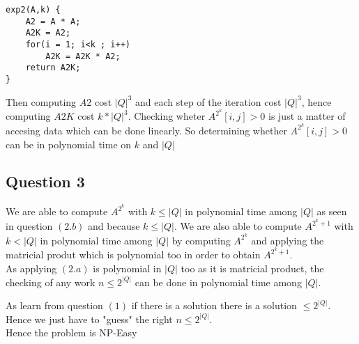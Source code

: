 \begin{lstlisting}
exp2(A,k) {
	A2 = A * A;
	A2K = A2;
	for(i = 1; i<k ; i++)
		A2K = A2K * A2;
	return A2K;
}
\end{lstlisting}
Then computing $A2$ cost $|Q|^3$ and each step of the iteration cost $|Q|^3$, hence computing $A2K$ cost $k*|Q|^3$. Checking wheter 
$A^{2^k}[i,j] > 0$ is just a matter of accesing data which can be done linearly.
So determining whether $A^{2^k}[i,j] > 0$ can be in polynomial time on $k$ and $|Q|$
 
\subsection{Question 3}
 
We are able to compute $A^{2^k}$ with $k\le|Q|$ in polynomial time among $|Q|$ as seen in question $(2.b)$ and because $k\le|Q|$.
We are also able to compute $A^{2^{k}+1}$ with $k < |Q|$ in polynomial time among $|Q|$  by computing $A^{2^k}$ and applying the matricial produt which is polynomial too in order to obtain $A^{2^{k}+1}$.
\\As applying $(2.a)$ is polynomial in $|Q|$ too as it is matricial product,
the checking of any work $n \le 2^{|Q|}$ can be done in polynomial time among $|Q|$.

As learn from question $(1)$ if there is a solution there is a solution $\le 2^{|Q|}$.
\\Hence we just have to "guess" the right $n \le 2^|Q|$.
\\Hence the problem is NP-Easy